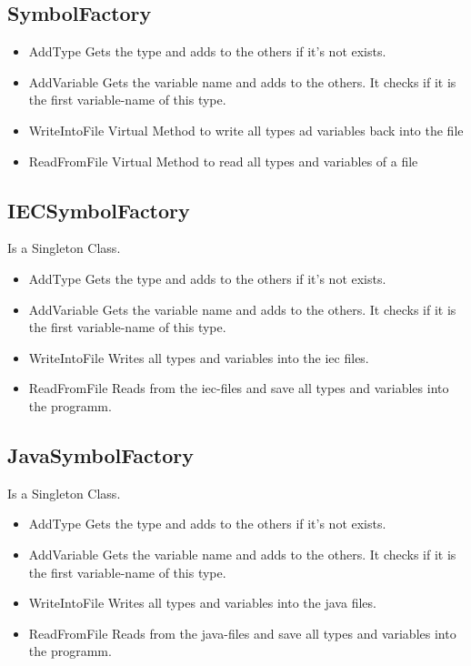 \subsection{SymbolFactory}
\begin{itemize}
	\item AddType
	\subitem Gets the type and adds to the others if it's not exists.
	\item AddVariable
	\subitem Gets the variable name and adds to the others. It checks if it is the first variable-name of this type.
	\item WriteIntoFile
	\subitem Virtual Method to write all types ad variables back into the file
	\item ReadFromFile
	 \subitem Virtual Method to read all types and variables of a file
\end{itemize}

\subsection{IECSymbolFactory}
Is a Singleton Class.
\begin{itemize}
	\item AddType
	\subitem Gets the type and adds to the others if it's not exists.
	\item AddVariable
	\subitem Gets the variable name and adds to the others. It checks if it is the first variable-name of this type.
	\item WriteIntoFile
	\subitem Writes all types and variables into the iec files.
	\item ReadFromFile
	 \subitem Reads from the iec-files and save all types and variables into the programm.
\end{itemize}

\subsection{JavaSymbolFactory}
Is a Singleton Class.
\begin{itemize}
	\item AddType
	\subitem Gets the type and adds to the others if it's not exists.
	\item AddVariable
	\subitem Gets the variable name and adds to the others. It checks if it is the first variable-name of this type.
	\item WriteIntoFile
	\subitem Writes all types and variables into the java files.
	\item ReadFromFile
	 \subitem Reads from the java-files and save all types and variables into the programm.
\end{itemize}

